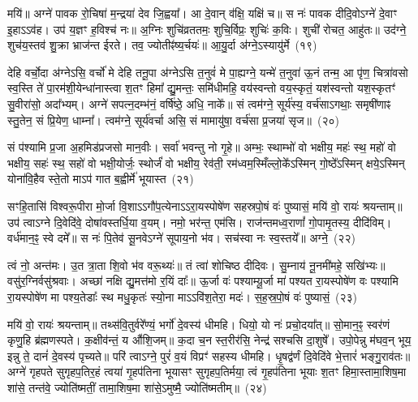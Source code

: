 मयि॑॥ अग्ने॑ पावक रो॒चिषा॑ म॒न्द्रया॑ देव जि॒ह्वया᳚। आ दे॒वान् व॑क्षि॒ यक्षि॑ च॥ स नः॑ पावक दीदि॒वो\-ऽग्ने॑ दे॒वाꣳ इ॒हा\-ऽऽ\-व॑ह। उप॑ य॒ज्ञꣳ ह॒विश्च॑ नः॥ अ॒ग्निः शुचि॑व्रततमः॒ शुचि॒र्विप्रः॒ शुचिः॑ क॒विः। शुची॑ रोचत॒ आहु॑तः॥ उद॑ग्ने॒ शुच॑य॒स्तव॑ शु॒क्रा भ्राज॑न्त ईरते। तव॒ ज्योतीꣴ॑ष्य॒र्चयः॑॥ आ॒यु॒र्दा अ॑ग्ने॒\-ऽस्यायु॑र्मे~(१९)

देहि वर्चो॒दा अ॑ग्ने\-ऽसि॒ वर्चो॑ मे देहि तनू॒पा अ॑ग्ने\-ऽसि त॒नुवं॑ मे पा॒ह्यग्ने॒ यन्मे॑ त॒नुवा॑ ऊ॒नं तन्म॒ आ पृ॑ण॒ चित्रा॑वसो स्व॒स्ति ते॑ पा॒रम॑शी॒येन्धा॑नास्त्वा श॒तꣳ हिमा᳚ द्यु॒मन्तः॒ समि॑धीमहि॒ वय॑स्वन्तो वय॒स्कृतं॒ यश॑स्वन्तो यश॒स्कृतꣳ॑ सु॒वीरा॑सो॒ अदा᳚भ्यम्। अग्ने॑ सपत्न॒दम्भ॑नं॒ वर्\mbox{}षि॑ष्ठे॒ अधि॒ नाके᳚॥ सं त्वम॑ग्ने॒ सूर्य॑स्य॒ वर्च॑सा\-ऽगथाः॒ समृषी॑णाꣴ स्तु॒तेन॒ सं प्रि॒येण॒ धाम्ना᳚। त्वम॑ग्ने॒ सूर्य॑वर्चा असि॒ सं मामायु॑षा॒ वर्च॑सा प्र॒जया॑ सृज॥~(२०)

{\anuvakamend[{आ॒हु॒वध्यै॑ र॒यिं मे॒ वर्च॑सा स॒प्तद॑श च}]}%

सं प॑श्यामि प्र॒जा अ॒हमिड॑प्रजसो मान॒वीः। सर्वा॑ भवन्तु नो गृ॒हे॥ अम्भः॒ स्थाम्भो॑ वो भक्षीय॒ महः॑ स्थ॒ महो॑ वो भक्षीय॒ सहः॑ स्थ॒ सहो॑ वो भक्षी॒योर्जः॒ स्थोर्जं॑ वो भक्षीय॒ रेव॑ती॒ रम॑ध्वम॒स्मिँल्लो॒के᳚\-ऽस्मिन् गो॒ष्ठे᳚\-ऽस्मिन् क्षये॒\-ऽस्मिन् योना॑वि॒हैव स्ते॒तो मा\-ऽप॑ गात ब॒ह्वीर्मे॑ भूयास्त~(२१)

सꣳहि॒तासि॑ विश्वरू॒पीरा मो॒र्जा वि॒शा\-ऽऽ\-गौ॑प॒त्येना\-ऽऽ\-रा॒यस्पोषे॑ण सहस्रपो॒षं वः॑ पुष्यासं॒ मयि॑ वो॒ रायः॑ श्रयन्ताम्॥ उप॑ त्वा\-ऽग्ने दि॒वेदि॑वे॒ दोषा॑वस्तर्धि॒या व॒यम्। नमो॒ भर॑न्त॒ एम॑सि। राज॑न्तमध्व॒राणां᳚ गो॒पामृ॒तस्य॒ दीदि॑विम्। वर्ध॑मान॒ꣴ॒ स्वे दमे᳚॥ स नः॑ पि॒तेव॑ सू॒नवे\-ऽग्ने॑ सूपाय॒नो भ॑व। सच॑स्वा नः स्व॒स्तये᳚॥ अग्ने॒~(२२)

त्वं नो॒ अन्त॑मः। उ॒त त्रा॒ता शि॒वो भ॑व वरू॒थ्यः॑॥ तं त्वा॑ शोचिष्ठ दीदिवः। सु॒म्नाय॑ नू॒नमी॑महे॒ सखि॑भ्यः॥ वसु॑र॒ग्निर्वसु॑श्रवाः। अच्छा॑ नक्षि द्यु॒मत्त॑मो र॒यिं दाः᳚॥ ऊ॒र्जा वः॑ पश्याम्यू॒र्जा मा॑ पश्यत रा॒यस्पोषे॑ण वः पश्यामि रा॒यस्पोषे॑ण मा पश्य॒तेडाः᳚ स्थ मधु॒कृतः॑ स्यो॒ना मा\-ऽऽ\-वि॑श॒तेरा॒ मदः॑। स॒ह॒स्र॒पो॒षं वः॑ पुष्यासं॒~(२३)

मयि॑ वो॒ रायः॑ श्रयन्ताम्॥ तथ्स॑वि॒तुर्वरे᳚ण्यं॒ भर्गो॑ दे॒वस्य॑ धीमहि। धियो॒ यो नः॑ प्रचो॒दया᳚त्॥ सो॒मान॒ꣴ॒ स्वर॑णं कृणु॒हि ब्र॑ह्मणस्पते। क॒क्षीव॑न्तं॒ य औ॑शि॒जम्॥ क॒दा च॒न स्त॒रीर॑सि॒ नेन्द्र॑ सश्चसि दा॒शुषे᳚। उपो॒पेन्नु म॑घव॒न् भूय॒ इन्नु ते॒ दानं॑ दे॒वस्य॑ पृच्यते॥ परि॑ त्वा\-ऽग्ने॒ पुरं॑ व॒यं विप्रꣳ॑ सहस्य धीमहि। धृ॒षद्व॑र्णं दि॒वेदि॑वे भे॒त्तारं॑ भङ्गु॒राव॑तः॥ अग्ने॑ गृहपते सुगृहप॒तिर॒हं त्वया॑ गृ॒हप॑तिना भूयासꣳ सुगृहप॒तिर्मया॒ त्वं गृ॒हप॑तिना भूयाः श॒तꣳ हिमा॒स्तामा॒शिष॒मा शा॑से॒ तन्त॑वे॒ ज्योति॑ष्मतीं॒ तामा॒शिष॒मा शा॑से॒\-ऽमुष्मै॒ ज्योति॑ष्मतीम्॥~(२४)

